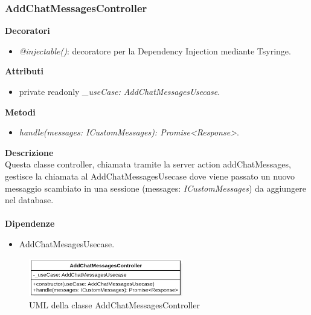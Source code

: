 \subsubsection{AddChatMessagesController}
\textbf{Decoratori}
\begin{itemize}
    \item \textit{@injectable()}: decoratore per la Dependency Injection mediante Tsyringe.
\end{itemize}
\textbf{Attributi}
\begin{itemize}
    \item private readonly \textit{\_useCase: AddChatMessagesUsecase}.
\end{itemize}
\textbf{Metodi}
\begin{itemize}
    \item \textit{handle(messages: ICustomMessages): Promise<Response>}.
\end{itemize}
\textbf{Descrizione}\\
Questa classe controller, chiamata tramite la server action addChatMessages, gestisce la chiamata al AddChatMessagesUsecase dove viene passato un nuovo messaggio scambiato in una sessione (messages: \textit{ICustomMessages}) da aggiungere nel database.\\ \\
\textbf{Dipendenze}
\begin{itemize}
    \item AddChatMesagesUsecase.
\end{itemize}

\begin{figure}[h!]
    \centering  
    \includegraphics[width=0.6\textwidth]{AddChatMessagesController.png}
    \caption{UML della classe AddChatMessagesController}
\end{figure}

